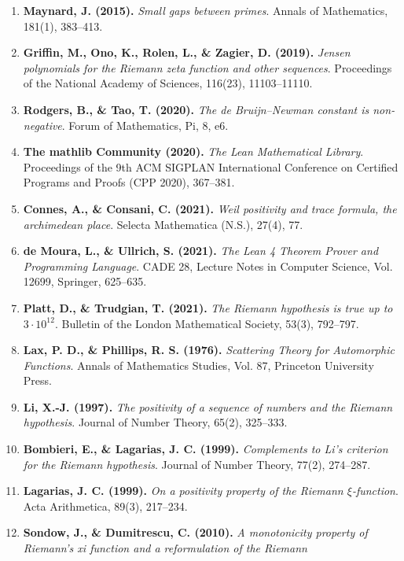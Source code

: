 \documentclass[
  11pt,
]{article}
\begin{document}
\begin{enumerate}
{  difference between consecutive primes, II}. Proceedings of the London
  Mathematical Society, 83(3), 532--562.
\item
  \textbf{Maynard, J. (2015).} \emph{Small gaps between primes}. Annals
  of Mathematics, 181(1), 383--413.
\item
  \textbf{Griffin, M., Ono, K., Rolen, L., \& Zagier, D. (2019).}
  \emph{Jensen polynomials for the Riemann zeta function and other
  sequences}. Proceedings of the National Academy of Sciences, 116(23),
  11103--11110.
\item
  \textbf{Rodgers, B., \& Tao, T. (2020).} \emph{The de Bruijn--Newman
  constant is non-negative}. Forum of Mathematics, Pi, 8, e6.
\item
  \textbf{The mathlib Community (2020).} \emph{The Lean Mathematical
  Library}. Proceedings of the 9th ACM SIGPLAN International Conference
  on Certified Programs and Proofs (CPP 2020), 367--381.
\item
  \textbf{Connes, A., \& Consani, C. (2021).} \emph{Weil positivity and
  trace formula, the archimedean place}. Selecta Mathematica (N.S.),
  27(4), 77.
\item
  \textbf{de Moura, L., \& Ullrich, S. (2021).} \emph{The Lean 4 Theorem
  Prover and Programming Language}. CADE 28, Lecture Notes in Computer
  Science, Vol. 12699, Springer, 625--635.
\item
  \textbf{Platt, D., \& Trudgian, T. (2021).} \emph{The Riemann
  hypothesis is true up to \(3 \cdot 10^{12}\)}. Bulletin of the London
  Mathematical Society, 53(3), 792--797.
\item
  \textbf{Lax, P. D., \& Phillips, R. S. (1976).} \emph{Scattering
  Theory for Automorphic Functions}. Annals of Mathematics Studies, Vol.
  87, Princeton University Press.
\item
  \textbf{Li, X.-J. (1997).} \emph{The positivity of a sequence of
  numbers and the Riemann hypothesis}. Journal of Number Theory, 65(2),
  325--333.
\item
  \textbf{Bombieri, E., \& Lagarias, J. C. (1999).} \emph{Complements to
  Li's criterion for the Riemann hypothesis}. Journal of Number Theory,
  77(2), 274--287.
\item
  \textbf{Lagarias, J. C. (1999).} \emph{On a positivity property of the
  Riemann \(\xi\)-function}. Acta Arithmetica, 89(3), 217--234.
\item
  \textbf{Sondow, J., \& Dumitrescu, C. (2010).} \emph{A monotonicity
  property of Riemann's xi function and a reformulation of the Riemann
}
\end{enumerate}
\end{document}
